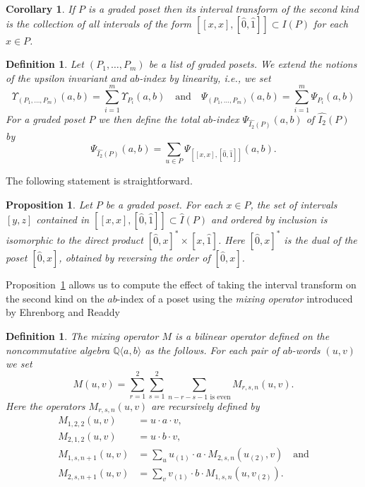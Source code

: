 \documentclass[reqno,12pt]{amsart}
\numberwithin{equation}{section}
\newtheorem{proposition}[theorem]{Proposition}
\newtheorem{definition}[theorem]{Definition}
\newtheorem{corollary}[theorem]{Corollary}
\newcommand{\0}{\widehat{0}}
\newcommand{\1}{\widehat{1}}
\newcommand{\2}{\widehat{2}}
\newcommand{\grI}{\widehat{I}}
\newcommand{\grII}{\widehat{I_2}}
\begin{document}
\begin{corollary}
\label{cor:iit2}  
If $P$ is a graded poset then its interval transform of the second kind
is the collection of all intervals of the form
$[[x,x], [\0,\1]]\subset I(P)$ for each $x\in P$.    
\end{corollary}

\begin{definition}
\label{def:grII}  
Let $(P_1,\ldots,P_m)$ be a list of graded posets. We extend the
notions of the upsilon invariant and $ab$-index by linearity, i.e., we
set
$$
\Upsilon_{(P_1,\ldots,P_m)}(a,b)=\sum_{i=1}^m \Upsilon_{P_i}(a,b)
\quad\mbox{and}\quad
\Psi_{(P_1,\ldots,P_m)}(a,b)=\sum_{i=1}^m \Psi_{P_i}(a,b)
$$
For a graded poset $P$ we then define the {\em total $ab$-index}
$\Psi_{\grII(P)}(a,b)$ of $\grII(P)$ by 
$$\Psi_{\grII(P)}(a,b)=\sum_{u\in P} \Psi_{[[x,x], [\0,\1]]}(a,b).$$
\end{definition}  

The following statement is straightforward.
\begin{proposition}
\label{prop:i2prod}  
Let $P$ be a graded poset. For each $x\in P$, the set of intervals
$[y,z]$ contained in $[[x,x],[\0,\1]]\subset \grI(P)$ and
ordered by inclusion is isomorphic to the direct product $[\0,x]^*\times
[x,\1]$. Here $[\0,x]^*$ is the {\em dual} of the poset $[\0,x]$,
obtained by reversing the order of $[\0,x]$. 
\end{proposition}

Proposition~\ref{prop:i2prod} allows us to compute the effect of taking
the interval transform on the second kind on the $ab$-index of a poset
using the {\em mixing operator} introduced by Ehrenborg and
Readdy~\cite[Definition 9.1]{Ehrenborg-Readdy-cop}   
\begin{definition}
The {\em mixing operator $M$} is a bilinear operator defined on the
noncommutative algebra ${\mathbb Q}\langle a, b\rangle$ as the
follows. For each pair of $ab$-words $(u,v)$ we set 
$$
M(u,v)=\sum_{r=1}^2\sum_{s=1}^2 \sum_{n-r-s-1 \mbox{ is even}} M_{r,s,n}(u,v). 
$$
Here the operators $M_{r,s,n}(u,v)$ are recursively defined by
\begin{align*}
  M_{1,2,2}(u,v)&= u\cdot a\cdot v,\\
  M_{2,1,2}(u,v)&= u\cdot b\cdot v,\\
  M_{1,s,n+1}(u,v)&=\sum_{u} u_{(1)}\cdot a\cdot
  M_{2,s,n}(u_{(2)},v)\quad \mbox{and}\\
  M_{2,s,n+1}(u,v)&=\sum_{v} v_{(1)}\cdot b\cdot M_{1,s,n}(u,v_{(2)}).\\
\end{align*}  
\end{definition}   
\end{document}

